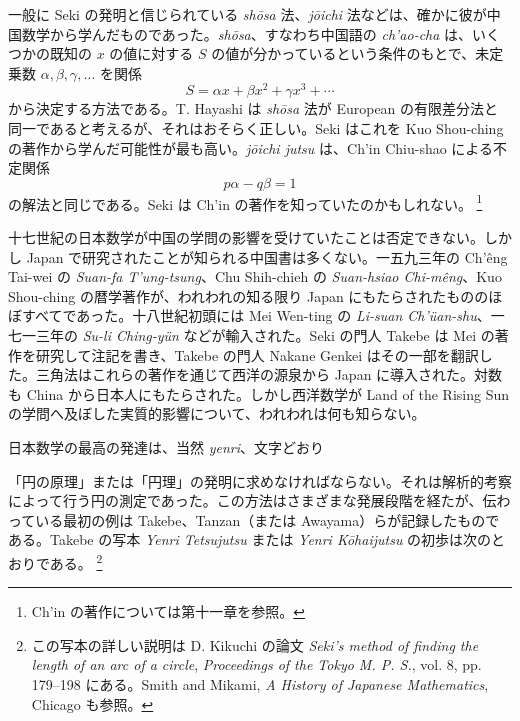 \documentclass[11pt]{article}
\newcommand{\scanpage}[2]{\clearpage\setcounter{footnote}{0}\noindent{\footnotesize\color{gray}PDF #1 頁 · #2}\par\medskip}
\newcommand{\scanfooter}{}
\begin{document}
一般に Seki の発明と信じられている \emph{shōsa} 法、\emph{jōichi} 法などは、確かに彼が中国数学から学んだものであった。\emph{shōsa}、すなわち中国語の \emph{ch'ao-cha} は、いくつかの既知の $x$ の値に対する $S$ の値が分かっているという条件のもとで、未定乗数 $\alpha,\beta,\gamma,\ldots$ を関係
\[
S=\alpha x+\beta x^2+\gamma x^3+\cdots
\]
から決定する方法である。T. Hayashi は \emph{shōsa} 法が European の有限差分法と同一であると考えるが、それはおそらく正しい。Seki はこれを Kuo Shou-ching の著作から学んだ可能性が最も高い。\emph{jōichi jutsu} は、Ch'in Chiu-shao による不定関係
\[
p\alpha-q\beta=1
\]
の解法と同じである。Seki は Ch'in の著作を知っていたのかもしれない。
\footnote{Ch'in の著作については第十一章を参照。}

十七世紀の日本数学が中国の学問の影響を受けていたことは否定できない。しかし Japan で研究されたことが知られる中国書は多くない。一五九三年の Ch'êng Tai-wei の \emph{Suan-fa T'ung-tsung}、Chu Shih-chieh の \emph{Suan-hsiao Chi-mêng}、Kuo Shou-ching の暦学著作が、われわれの知る限り Japan にもたらされたもののほぼすべてであった。十八世紀初頭には Mei Wen-ting の \emph{Li-suan Ch'üan-shu}、一七一三年の \emph{Su-li Ching-yün} などが輸入された。Seki の門人 Takebe は Mei の著作を研究して注記を書き、Takebe の門人 Nakane Genkei はその一部を翻訳した。三角法はこれらの著作を通じて西洋の源泉から Japan に導入された。対数も China から日本人にもたらされた。しかし西洋数学が Land of the Rising Sun の学問へ及ぼした実質的影響について、われわれは何も知らない。

日本数学の最高の発達は、当然 \emph{yenri}、文字どおり
\scanfooter

\scanpage{0178}{第22章、印刷頁164}
「円の原理」または「円理」の発明に求めなければならない。それは解析的考察によって行う円の測定であった。この方法はさまざまな発展段階を経たが、伝わっている最初の例は Takebe、Tanzan（または Awayama）らが記録したものである。Takebe の写本 \emph{Yenri Tetsujutsu} または \emph{Yenri Kōhaijutsu} の初歩は次のとおりである。
\footnote{この写本の詳しい説明は D. Kikuchi の論文 \emph{Seki's method of finding the length of an arc of a circle}, \emph{Proceedings of the Tokyo M. P. S.}, vol. 8, pp. 179--198 にある。Smith and Mikami, \emph{A History of Japanese Mathematics}, Chicago も参照。}
\end{document}
